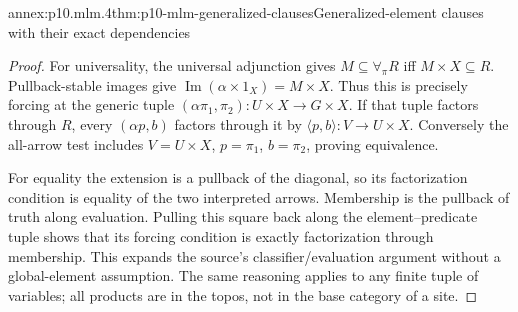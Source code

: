 \begin{annexitem}{annex:p10.mlm.4}{thm:p10-mlm-generalized-clauses}{Generalized-element clauses with their exact dependencies}
\begin{proof}
For universality, the universal adjunction gives
\(M\subseteq\forall_\pi R\) iff \(M\times X\subseteq R\).
Pullback-stable images give
\(\operatorname{Im}(\alpha\times1_X)=M\times X\).
Thus this is precisely forcing at the generic tuple
\((\alpha\pi_1,\pi_2):U\times X\to G\times X\).
If that tuple factors through \(R\), every \((\alpha p,b)\) factors through
it by \(\langle p,b\rangle:V\to U\times X\). Conversely the all-arrow test
includes \(V=U\times X\), \(p=\pi_1\), \(b=\pi_2\), proving equivalence.

For equality the extension is a pullback of the diagonal, so its
factorization condition is equality of the two interpreted arrows.
Membership is the pullback of truth along evaluation. Pulling this square
back along the element--predicate tuple shows that its forcing condition is
exactly factorization through membership. This expands the source's
classifier/evaluation argument without a global-element assumption.
The same reasoning applies to any finite tuple of variables; all products
are in the topos, not in the base category of a site.
\end{proof}
\end{annexitem}

